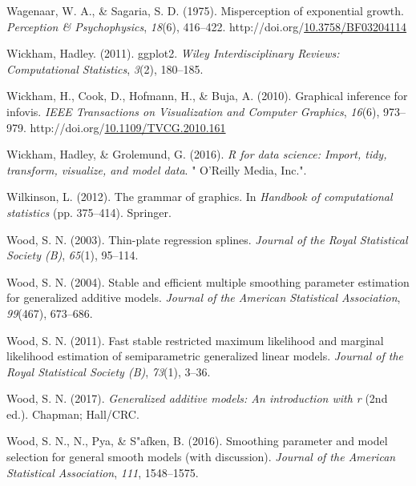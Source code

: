 \documentclass[print]{nuthesis}
\newlength{\cslhangindent}
\newenvironment{CSLReferences}%
{\setlength{\parindent}{0pt}%
\everypar{\setlength{\hangindent}{\cslhangindent}}\ignorespaces}%
{\par}
\begin{document}
\begin{CSLReferences}{1}{0}
\leavevmode\hypertarget{ref-wagenaar_misperception_1975}{}%
Wagenaar, W. A., \& Sagaria, S. D. (1975). Misperception of exponential growth. \emph{Perception \& Psychophysics}, \emph{18}(6), 416--422. http://doi.org/\href{https://doi.org/10.3758/BF03204114}{10.3758/BF03204114}

\leavevmode\hypertarget{ref-wickham2011ggplot2}{}%
Wickham, Hadley. (2011). ggplot2. \emph{Wiley Interdisciplinary Reviews: Computational Statistics}, \emph{3}(2), 180--185.

\leavevmode\hypertarget{ref-wickham_graphical_2010}{}%
Wickham, H., Cook, D., Hofmann, H., \& Buja, A. (2010). Graphical inference for infovis. \emph{IEEE Transactions on Visualization and Computer Graphics}, \emph{16}(6), 973--979. http://doi.org/\href{https://doi.org/10.1109/TVCG.2010.161}{10.1109/TVCG.2010.161}

\leavevmode\hypertarget{ref-wickham2016r}{}%
Wickham, Hadley, \& Grolemund, G. (2016). \emph{R for data science: Import, tidy, transform, visualize, and model data}. " O'Reilly Media, Inc.".

\leavevmode\hypertarget{ref-wilkinson2012grammar}{}%
Wilkinson, L. (2012). The grammar of graphics. In \emph{Handbook of computational statistics} (pp. 375--414). Springer.

\leavevmode\hypertarget{ref-mgcv5}{}%
Wood, S. N. (2003). Thin-plate regression splines. \emph{Journal of the Royal Statistical Society (B)}, \emph{65}(1), 95--114.

\leavevmode\hypertarget{ref-mgcv3}{}%
Wood, S. N. (2004). Stable and efficient multiple smoothing parameter estimation for generalized additive models. \emph{Journal of the American Statistical Association}, \emph{99}(467), 673--686.

\leavevmode\hypertarget{ref-mgcv1}{}%
Wood, S. N. (2011). Fast stable restricted maximum likelihood and marginal likelihood estimation of semiparametric generalized linear models. \emph{Journal of the Royal Statistical Society (B)}, \emph{73}(1), 3--36.

\leavevmode\hypertarget{ref-mgcv4}{}%
Wood, S. N. (2017). \emph{Generalized additive models: An introduction with r} (2nd ed.). Chapman; Hall/CRC.

\leavevmode\hypertarget{ref-mgcv2}{}%
Wood, S. N., N., Pya, \& S"afken, B. (2016). Smoothing parameter and model selection for general smooth models (with discussion). \emph{Journal of the American Statistical Association}, \emph{111}, 1548--1575.

\end{CSLReferences}
\end{document}
